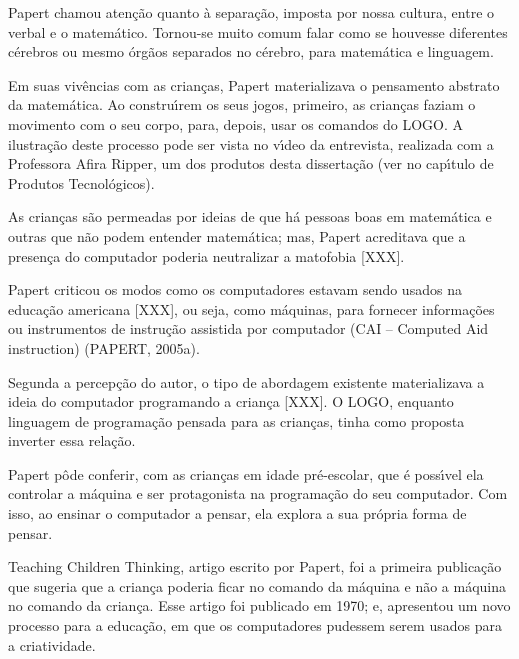 \documentclass[
12pt,		%
openright,	%
twoside,  %
a4paper,			%
chapter=TITLE,		%
english,			%
french,				%
spanish,			%
brazil				%
]{USPSC-classe/USPSC}
\begin{document}
Papert chamou aten\c{c}\~ao quanto \`a separa\c{c}\~ao, imposta por nossa cultura, entre o verbal e o matem\'atico. Tornou-se muito comum falar como se houvesse diferentes c\'erebros ou mesmo \'org\~aos separados no c\'erebro, para matem\'atica e linguagem.




Em suas viv\^encias com as crian\c{c}as, Papert materializava o pensamento abstrato da matem\'atica. Ao constru\'{\i}rem os seus jogos, primeiro, as crian\c{c}as faziam o movimento com o seu corpo, para, depois, usar os comandos do LOGO. A ilustra\c{c}\~ao deste processo pode ser vista no v\'{\i}deo  da entrevista, realizada com a Professora Afira Ripper,  um dos produtos desta disserta\c{c}\~ao (ver no cap\'{\i}tulo de Produtos Tecnol\'ogicos).




As crian\c{c}as s\~ao permeadas por ideias de que h\'a pessoas boas em matem\'atica e outras que n\~ao podem entender matem\'atica; mas, Papert acreditava que a presen\c{c}a do computador poderia neutralizar a matofobia [XXX].




Papert criticou os modos como os computadores estavam sendo usados na educa\c{c}\~ao americana [XXX], ou seja, como m\'aquinas, para fornecer informa\c{c}\~oes ou instrumentos de instru\c{c}\~ao assistida por computador (CAI – Computed Aid instruction)  (PAPERT, 2005a).




Segunda a percep\c{c}\~ao do autor, o tipo de abordagem existente materializava a ideia do computador programando a crian\c{c}a [XXX]. O LOGO, enquanto linguagem de programa\c{c}\~ao pensada para as crian\c{c}as, tinha como proposta inverter essa rela\c{c}\~ao.




Papert p\^ode conferir, com as crian\c{c}as em idade pr\'e-escolar, que \'e poss\'{\i}vel ela controlar a m\'aquina e ser protagonista na programa\c{c}\~ao do seu computador. Com isso, ao ensinar o computador a pensar, ela explora a sua pr\'opria forma de pensar.




Teaching Children Thinking, artigo escrito por Papert, foi a primeira publica\c{c}\~ao que sugeria que a crian\c{c}a poderia ficar no comando da m\'aquina e n\~ao a m\'aquina no comando da crian\c{c}a.  Esse artigo  foi publicado em 1970; e,  apresentou um novo processo para a educa\c{c}\~ao, em que os computadores pudessem serem usados para a criatividade.
\end{document}

